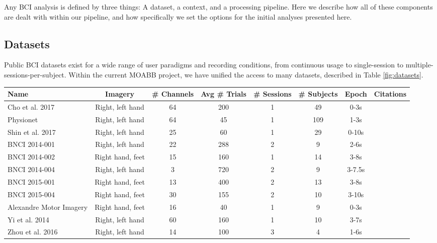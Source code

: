 Any BCI analysis is defined by three things: A dataset, a context, and
a processing pipeline. Here we describe how all of these components
are dealt with within our pipeline, and how specifically we set the
options for the initial analyses presented here.

\subsection{Datasets}

Public BCI datasets exist for a wide range of user paradigms and
recording conditions, from continuous usage to single-session to
multiple-sessions-per-subject. Within the current MOABB project, we
have unified the access to many datasets, described in Table
\ref{fig:datasets}.


\begin{table*}[ht]
  \centering
  \begin{tabular}{l || c | c | c | c | c | c | c }
    Name & Imagery & \# Channels & Avg \# Trials & \# Sessions & \# Subjects & Epoch & Citations \\ \hline
    Cho et al. 2017 & Right, left hand & 64 & 200 & 1 & 49 & 0-3s & \cite{Cho2017} \\
    Physionet & Right, left hand & 64 & 45 & 1 & 109 & 1-3s & \cite{Schalk2004, Goldberger2000} \\
    Shin et al. 2017 & Right, left hand & 25 & 60 & 1 & 29 & 0-10s & \cite{Blankertz2007, Shin2017} \\
    BNCI 2014-001 & Right, left hand & 22 & 288 & 2 & 9 & 2-6s & \cite{Tangermann2012} \\
    BNCI 2014-002 & Right hand, feet & 15 & 160 & 1 & 14 & 3-8s & \cite{Steyrl2016a} \\
    BNCI 2014-004 & Right, left hand & 3 & 720 & 2 & 9 & 3-7.5s & \cite{Leeb2007} \\
    BNCI 2015-001 & Right hand, feet & 13 & 400 & 2 & 13 & 3-8s & \cite{Faller2012} \\
    BNCI 2015-004 & Right hand, feet & 30 & 155 & 2 & 10 & 3-10s & \cite{Scherer2015} \\
    Alexandre Motor Imagery & Right hand, feet & 16 & 40 & 1 & 9 & 0-3s & \cite{Barachant2012a}\\
    Yi et al. 2014 & Right, left hand & 60 & 160 & 1 & 10 & 3-7s & \cite{Yi2014} \\
    Zhou et al. 2016 & Right, left hand & 14 & 100 & 3 & 4 & 1-6s & \cite{Zhou2016a}\\
    
\end{tabular}
    \caption{Dataset attributes}
    \label{fig:datasets}
\end{table*}

